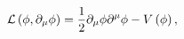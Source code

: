 \begin{equation}
{\cal L}\left(\phi, \partial_{\mu}\phi\right) = \frac{1}{2}
\partial_{\mu}\phi\partial^{\mu}\phi - V\left(\phi\right)
\label{E1},
\end{equation}

